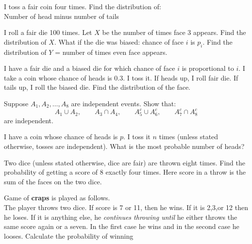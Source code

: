 \documentclass[12pt]{article}
\newenvironment{question}[2][Question]{\begin{trivlist}
\item[\hskip \labelsep {\bfseries #1}\hskip \labelsep {\bfseries #2.}]}{\end{trivlist}}
\begin{document}
\begin{question}{21}
I toss a fair coin four times. Find the distribution of:\\
Number of head minus number of tails
\end{question}

\begin{question}{22}
I roll a fair die 100 times. Let $X$ be the number of times face 3 appears. Find the distribution of $X$. What if the die was biased: chance of face $i$ is $p_i$. Find the distribution of $Y$ = number of times even face appears.
\end{question}

\begin{question}{23}
I have a fair die and a biased die for which chance of face $i$ is proportional to $i$. I take a coin whose chance of heads is 0.3. I toss it. If heads up, I roll fair die. If tails up, I roll the biased die. Find the distribution of the face.
\end{question}

\begin{question}{24}
Suppose $A_1,A_2,\ldots,A_8$ are independent events. Show that:
\[
A_1 \cup A_2,\qquad A_3 \cap A_4,\qquad A_5^c \cup A_6^c,\qquad A_7^c \cap A_8^c
\]
are independent.
\end{question}

\begin{question}{25}
I have a coin whose chance of heads is $p$. I toss it $n$ times (unless stated otherwise, tosses are independent). What is the most probable number of heads?
\end{question}

\begin{question}{26}
Two dice (unless stated otherwise, dice are fair) are thrown eight times. Find the probability of getting a score of 8 exactly four times. Here score in a throw is the sum of the faces on the two dice.
\end{question}

\begin{question}{27}
Game of \textbf{craps} is played as follows.\\ The player throws two dice. If score is 7 or 11, then he wins. If it is 2,3,or 12 then he loses. If it is anything else, he \textit{continues throwing until} he either throws the same score again or a seven. In the first case he wins and in the second case he looses. Calculate the probability of winning
\end{question}
\end{document}
